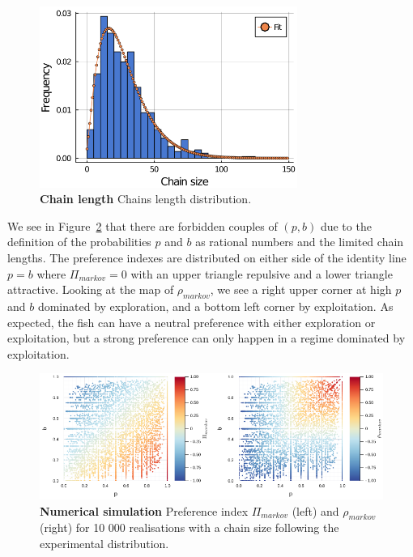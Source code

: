   \begin{figure}[htb]
    \centering
    \includegraphics[width=0.75\textwidth]{part_2/assets/chain_fit.png}
    \caption{\textbf{Chain length} Chains length distribution.}
    \label{chain_fit}
  \end{figure}

  We see in Figure~\ref{markov_simu} that there are forbidden couples of $(p,b)$ due to the definition of the probabilities $p$ and $b$ as rational numbers and the limited chain lengths. The preference indexes are distributed on either side of the identity line $p=b$ where $\Pi_{markov} = 0$ with an upper triangle repulsive and a lower triangle attractive. Looking at the map of $\rho_{markov}$, we see a right upper corner at high $p$ and $b$ dominated by exploration, and a bottom left corner by exploitation. As expected, the fish can have a neutral preference with either exploration or exploitation, but a strong preference can only happen in a regime dominated by exploitation.

  \begin{figure}[htb]
    \centering
    \includegraphics[width=1\textwidth]{part_2/assets/pi_pb.png}
    \caption{\textbf{Numerical simulation} Preference index $\Pi_{markov}$ (left) and $\rho_{markov}$ (right) for 10 000 realisations with a chain size following the experimental distribution.}
    \label{markov_simu}
  \end{figure}

